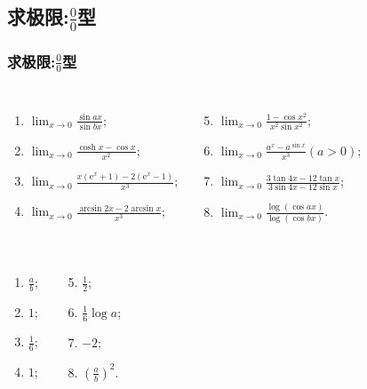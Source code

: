 \documentclass[
10pt,
aspectratio=43,
]{beamer}
\begin{document}
\subsection{求极限:$\displaystyle\frac{0}{0}$型}
\begin{frame}
	\frametitle{求极限:$\displaystyle\frac{0}{0}$型}
	\everymath{\displaystyle}
	{
		\small
		\begin{block}{}
			\begin{columns}[onlytextwidth]
				\begin{enumerate}
					\item $\lim _{x \rightarrow 0} \frac{\sin a x}{\sin b x}$;
					\item $\lim _{x \rightarrow 0} \frac{\cosh x-\cos x}{x^2}$;
					\item $\lim _{x \rightarrow 0} \frac{x\left(\mathrm{e}^x+1\right)-2\left(\mathrm{e}^x-1\right)}{x^3}$;
					\item $\lim _{x \rightarrow 0} \frac{\arcsin 2 x-2 \arcsin x}{x^3}$;
				\end{enumerate}
				\begin{enumerate}
					\setcounter{enumi}{4}
					\item $\lim _{x \rightarrow 0} \frac{1-\cos x^2}{x^2 \sin x^2}$;
					\item $\lim _{x \rightarrow 0} \frac{a^x-a^{\sin x}}{x^3}(a>0)$;
					\item $\lim _{x \rightarrow 0} \frac{3 \tan 4 x-12 \tan x}{3 \sin 4 x-12 \sin x}$;
					\item $\lim _{x \rightarrow 0} \frac{\log (\cos a x)}{\log (\cos b x)}$.
				\end{enumerate}
			\end{columns}
		\end{block}

		\begin{exampleblock}{}
			\begin{columns}[onlytextwidth]
				\begin{enumerate}
					\pause
					\item $\frac{a}{b}$;
					\item $ 1$;
					\pause
					\item $\frac{1}{6}$;
					\item $1$;
				\end{enumerate}
				\begin{enumerate}
					\setcounter{enumi}{4}
					\pause
					\item $ \frac{1}{2}$;
					\item $\frac16\log a$;
					\pause
					\item $-2$;
					\item $\left(\frac{ a}{b}\right)^2$.
				\end{enumerate}
			\end{columns}
		\end{exampleblock}
	}
\end{frame}
\end{document}
